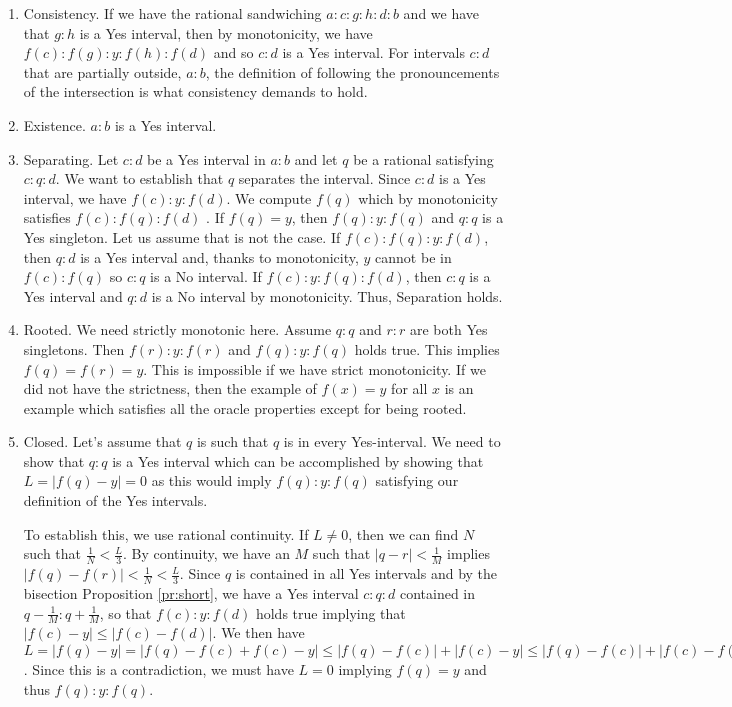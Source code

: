 \documentclass[12pt]{article}
\begin{document}
\begin{enumerate}
    \item Consistency. If we have the rational sandwiching $a:c:g:h:d:b$ and we have that $g:h$ is a Yes interval, then by monotonicity, we have $f(c):f(g):y:f(h):f(d)$ and so $c:d$ is a Yes interval. For intervals $c:d$ that are partially outside, $a:b$, the definition of following the pronouncements of the intersection is what consistency demands to hold. 
    \item Existence. $a:b$ is a Yes interval.
    \item Separating. Let $c:d$ be a Yes interval in $a:b$ and let $q$ be a rational satisfying $c:q:d$. We want to establish that $q$ separates the interval. Since $c:d$ is a Yes interval, we have $f(c):y:f(d)$. We compute $f(q)$ which by monotonicity satisfies $f(c):f(q):f(d)$ . If $f(q) = y$, then $f(q):y:f(q)$ and $q:q$ is a Yes singleton. Let us assume that is not the case. If $f(c):f(q):y:f(d)$, then $q:d$ is a Yes interval and, thanks to monotonicity, $y$ cannot be in $f(c):f(q)$ so $c:q$ is a No interval. If $f(c):y:f(q):f(d)$, then $c:q$ is a Yes interval and $q:d$ is a No interval by monotonicity. Thus, Separation holds. 
    \item Rooted. We need strictly monotonic here. Assume $q:q$ and $r:r$ are both Yes singletons. Then $f(r):y:f(r)$ and $f(q):y:f(q)$ holds true. This implies $f(q)=f(r)=y$. This is impossible if we have strict monotonicity. If we did not have the strictness, then the example of $f(x)=y$ for all $x$ is an example which satisfies all the oracle properties except for being rooted. 
    \item Closed. Let's assume that $q$ is such that $q$ is in every Yes-interval. We need to show that $q:q$ is a Yes interval which can be accomplished by showing that $L = |f(q) - y| = 0$ as this would imply $f(q):y:f(q)$ satisfying our definition of the Yes intervals. 
    
    To establish this, we use rational continuity. If $L \neq 0$, then we can find $N$ such that $\frac{1}{N} < \frac{L}{3}$. By continuity, we have an $M$ such that $|q-r|<\frac{1}{M}$ implies $|f(q)-f(r)| < \frac{1}{N} < \frac{L}{3}$. Since $q$ is contained in all Yes intervals and by the bisection Proposition \ref{pr:short}, we have a Yes interval $c:q:d$ contained in $q-\frac{1}{M}:q+\frac{1}{M}$, so that $f(c):y:f(d)$ holds true implying that $|f(c) - y| \leq |f(c)-f(d)|$. We then have $L = |f(q)-y| = |f(q) - f(c) + f(c) - y| \leq |f(q)-f(c)| + |f(c)-y| \leq |f(q)-f(c)| + |f(c) - f(d)| \leq |f(q) - f(c) | + |f(c) - f(q)| + |f(q) - f(d)| < \frac{3}{N} < L$. Since this is a contradiction, we must have $L=0$ implying $f(q) = y$ and thus $f(q):y:f(q)$.
\end{enumerate}
\end{document}
